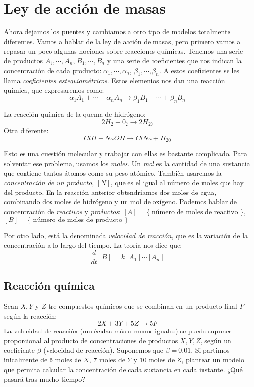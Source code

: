 \chapter{Ley de acción de masas}

Ahora dejamos los puentes y cambiamos a otro tipo de modelos totalmente diferentes. Vamos a hablar de la ley de acción de masas, pero primero vamos a repasar un poco algunas nociones sobre reacciones químicas. Tenemos una serie de productos $A_1,\cdots, A_n$, $B_1,\cdots, B_n$ y una serie de coeficientes que nos indican la concentración de cada producto: $\alpha_1,\cdots, \alpha_n$, $\beta_1,\cdots, \beta_n$. A estos coeficientes se les llama \textit{coeficientes estequiométricos}. Estos elementos nos dan una reacción química, que expresaremos como:
\[
\alpha_1A_1+\cdots+\alpha_nA_n \longrightarrow \beta_1B_1+\cdots+\beta_nB_n
\]
\begin{example} La reacción química de la quema de hidrógeno:
\[
2H_2+0_2\longrightarrow 2H_20
\]
Otra diferente:
\[
ClH+NaOH \longrightarrow ClNa+H_20
\]
\end{example}

Esto es una cuestión molecular y trabajar con ellas es bastante complicado. Para solventar ese problema, usamos los \textit{moles}. Un \textit{mol} es la cantidad de una sustancia que contiene tantos átomos como su peso atómico. También usaremos la \textit{concentración de un producto}, $[N]$, que es el igual al número de moles que hay del producto. En la reacción anterior obtendríamos dos moles de agua, combinando dos moles de hidrógeno y un mol de oxígeno. Podemos hablar de concentración de \textit{reactivos} y \textit{productos}: $[A] = \{ \text{ número de moles de reactivo } \}$, $[B] = \{ \text{ número de moles de producto } \}$

Por otro lado, está la denominada \textit{velocidad de reacción}, que es la variación de la concentración a lo largo del tiempo. La teoría nos dice que:
\[
\frac{d}{dt}[B]=k[A_1]\cdots[A_n]
\]

\section{Reacción química}

Sean $X,Y$ y $Z$ tre compuestos químicos que se combinan en un producto final $F$ según la reacción:
\[
2X+3Y+5Z\longrightarrow 5F
\]
La velocidad de reacción (moléculas más o menos iguales) se puede suponer proporcional al producto de concentraciones de productos $X,Y,Z$, según un coeficiente $\beta$ (velocidad de reacción). Suponemos que $\beta=0.01$. Si partimos inicalmente de 5 moles de $X$, 7 moles de $Y$ y 10 moles de $Z$, plantear un modelo que permita calcular la concentración de cada sustancia en cada instante. ¿Qué pasará tras mucho tiempo?

